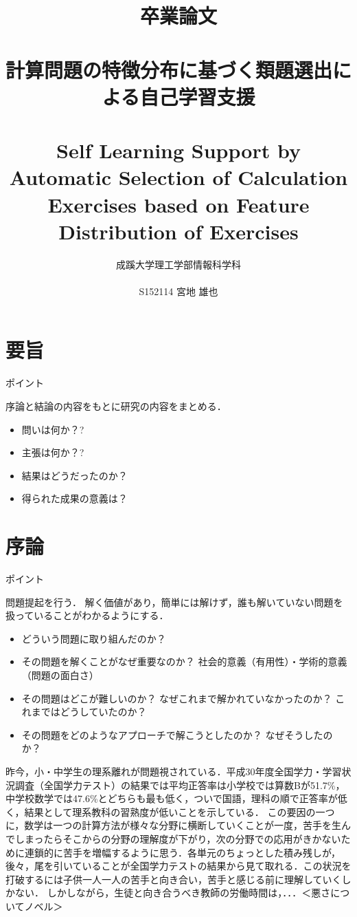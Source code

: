 \documentclass[a4j,11pt,report]{jsbook}
\title{卒業論文\\ \vspace{3em}\\{\huge #1}\\ \\#2\vspace{15em}}%
\author{{\huge 成蹊大学理工学部情報科学科}\\ \\{\huge #3}}%
\date{}
\newcommand{\frontpage}[3]{%
\title{卒業論文\\ \vspace{3em}\\{\huge #1}\\ \\#2\vspace{15em}}%
\author{{\huge 成蹊大学理工学部情報科学科}\\ \\{\huge #3}}%
\date{}
\maketitle
\clearpage
\thispagestyle{empty}

\clearpage
}
\newcommand{\point}[1]{
\begin{itembox}[l]{ポイント}
  #1
\end{itembox}
}
\begin{document}
\frontpage  %
{計算問題の特徴分布に基づく類題選出による自己学習支援}
{Self Learning Support by Automatic Selection of Calculation Exercises based on Feature Distribution of Exercises}
{S152114 宮地 雄也}

\chapter*{要旨}
\thispagestyle{empty}
\point{
序論と結論の内容をもとに研究の内容をまとめる．
\begin{itemize}
  \item 問いは何か？?
  \item 主張は何か？?
  \item 結果はどうだったのか？
  \item 得られた成果の意義は？
\end{itemize}
}

\tableofcontents
\thispagestyle{empty}
\clearpage
\thispagestyle{plain}
\setcounter{page}{1}

\chapter{序論 \label{ch:introduction}}

\point{
問題提起を行う．
解く価値があり，簡単には解けず，誰も解いていない問題を扱っていることがわかるようにする．
\begin{itemize}
  \item どういう問題に取り組んだのか？
  \item その問題を解くことがなぜ重要なのか？ 社会的意義（有用性）・学術的意義（問題の面白さ）
  \item その問題はどこが難しいのか？ なぜこれまで解かれていなかったのか？ これまではどうしていたのか？
  \item その問題をどのようなアプローチで解こうとしたのか？ なぜそうしたのか？
\end{itemize}
}

昨今，小・中学生の理系離れが問題視されている．平成30年度全国学力・学習状況調査（全国学力テスト）の結果では平均正答率は小学校では算数Bが51.7\%，中学校数学では47.6\%とどちらも最も低く，ついで国語，理科の順で正答率が低く，結果として理系教科の習熟度が低いことを示している．
この要因の一つに，数学は一つの計算方法が様々な分野に横断していくことが一度，苦手を生んでしまったらそこからの分野の理解度が下がり，次の分野での応用がきかないために連鎖的に苦手を増幅するように思う．各単元のちょっとした積み残しが，後々，尾を引いていることが全国学力テストの結果から見て取れる．この状況を打破するには子供一人一人の苦手と向き合い，苦手と感じる前に理解していくしかない．
しかしながら，生徒と向き合うべき教師の労働時間は，．．．＜悪さについてノベル＞
\end{document}
